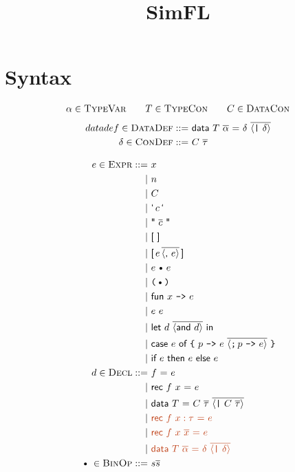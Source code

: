 \documentclass{article}
\title{SimFL}
\def\code#1{\textsf{#1}}
\def\por{\ | \ }
\def\binop{\, \text{\textbullet}\, }
\begin{document}
\maketitle
\section*{Syntax}

\begin{gather*}
\alpha \in \textsc{TypeVar}\qquad T \in \textsc{TypeCon}\qquad C \in \textsc{DataCon}
\end{gather*}
\begin{align*}
datadef\in \textsc{DataDef} ::= \ & \code{data $T$ $\overline{\alpha}$ = $\delta$ }\overline{\langle\texttt{|}\ \delta\rangle}\\
\delta \in \textsc{ConDef} ::= \ & \code{$C$ $\overline{\tau}$}
\end{align*}

\begin{align*}
e \in \textsc{Expr} ::= \ & x \\
\por & n \\
\por & C \\
\por & \code{`$\,c\,$`}\\
\por & \code{" $\overline{c}$ "}\\
\por & \code{[ ]}\\
\por & \code{[}\,e\,\overline{\langle \code{,}\ e\rangle}\,\code{]}\\
\por & e \binop e\\
\por & \texttt{($\binop$)}\\
\por & \code{fun $x$ \texttt{->} $e$}\\
\por & e \ e\\
\por & \code{let $d$ } \overline{\langle \code{and} \ d\rangle}\code{ in }\\
\por & \code{case $e$ of }\texttt{\char`\{} \ \code{$p$ \texttt{->} $e$}\ \overline{\langle \texttt{;} \, \code{$p$ \texttt{->} $e$}\rangle} \ \texttt{\char`\}}\\
\por & \code{if $e$ then $e$ else $e$}\\
%
d \in \textsc{Decl} ::= \ & \code{$f$ = $e$}\\
\por & \code{rec $f$ $x$ = $e$}\\
\por & \code{data $T$ = }\code{$C$ $\overline{\tau}$ }\overline{\langle\texttt{|} \ C\ \overline{\tau}\rangle}\\
\por & {\color{Bittersweet}\code{rec $f$ $x:\tau$ = $e$}}\\
\por & {\color{Bittersweet}\code{rec $f$ $x$ $\overline{x}$ = $e$}}\\
\por & {\color{Bittersweet}\code{data $T$ $\overline{\alpha}$ = $\delta$ }\overline{\langle\texttt{|}\ \delta\rangle}}\\
%
\binop \in \textsc{BinOp} ::= \ & s\overline{s}
\end{align*}
\end{document}
